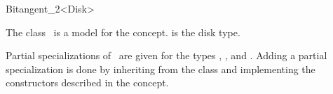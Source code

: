 
\ccRefPageBegin


\begin{ccRefClass}{Bitangent_2<Disk>}
\label{pageBitangent_2}

\ccDefinition

The class \ccRefName\ is a model for the  concept.  is
the disk type.

Partial specializations of \ccRefName\ are given for the types
, ,  and
.
Adding a partial specialization is done by inheriting from the class
 and implementing the constructors described in
the  concept.


\ccInheritsFrom
{}

\ccIsModel
{}

\ccTypes
{}
\ccThreeToTwo




\end{ccRefClass}
